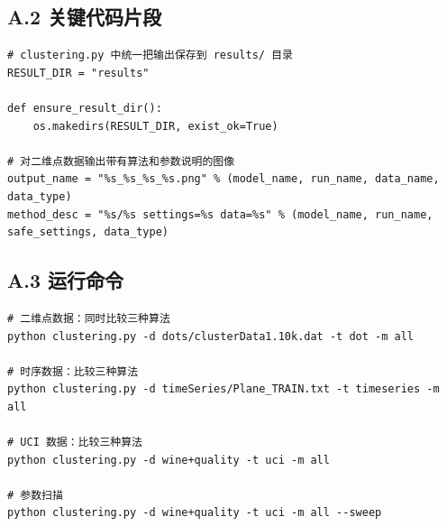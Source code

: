 \documentclass[12pt,a4paper]{ctexart}
\begin{document}
\subsection*{A.2 关键代码片段}
\begin{lstlisting}
# clustering.py 中统一把输出保存到 results/ 目录
RESULT_DIR = "results"

def ensure_result_dir():
    os.makedirs(RESULT_DIR, exist_ok=True)

# 对二维点数据输出带有算法和参数说明的图像
output_name = "%s_%s_%s_%s.png" % (model_name, run_name, data_name, data_type)
method_desc = "%s/%s settings=%s data=%s" % (model_name, run_name, safe_settings, data_type)
\end{lstlisting}

\subsection*{A.3 运行命令}
\begin{verbatim}
# 二维点数据：同时比较三种算法
python clustering.py -d dots/clusterData1.10k.dat -t dot -m all

# 时序数据：比较三种算法
python clustering.py -d timeSeries/Plane_TRAIN.txt -t timeseries -m all

# UCI 数据：比较三种算法
python clustering.py -d wine+quality -t uci -m all

# 参数扫描
python clustering.py -d wine+quality -t uci -m all --sweep
\end{verbatim}
\end{document}
